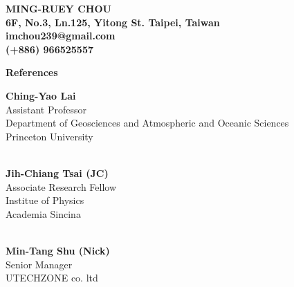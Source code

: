\documentclass[10pt]{article}
\newcommand{\bwhref}[3][black]{\href{#2}{\color{#1}{#3}}}
\begin{document}
\begin{center}
\large\bf MING-RUEY CHOU\\ %
6F, No.3, Ln.125, Yitong St. Taipei, Taiwan\\imchou239@gmail.com\\(+886) 966525557%
\end{center} 

{\large\bf References} \\

\begin{minipage}[t]{1.0\linewidth}
    {\large\bf Ching-Yao Lai} \\
    Assistant Professor \\
    Department of Geosciences and Atmospheric and Oceanic Sciences \\
    Princeton University \\
    \Letter\ \bwhref{cylai@princeton.edu}{cylai@princeton.edu} \\
\end{minipage}

\begin{minipage}[t]{1.0\linewidth}
    {\large\bf Jih-Chiang Tsai (JC)} \\
    Associate Research Fellow \\
    Institue of Physics \\
    Academia Sincina\\
    \Letter\ \bwhref{jctsai@phys.sinica.edu.tw}{jctsai@phys.sinica.edu.tw} \\
\end{minipage}

\begin{minipage}[t]{1.0\linewidth}
    {\large\bf Min-Tang Shu (Nick) } \\
    Senior Manager \\
    UTECHZONE co. ltd\\
    \Letter\ \bwhref{nick@utechzone.com.tw}{nick@utechzone.com.tw} \\
\end{minipage}

\end{document}
